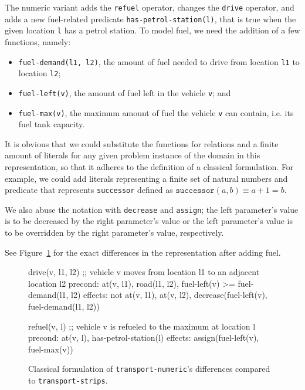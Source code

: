 The numeric variant  adds the \verb+refuel+ operator, changes the \verb+drive+
operator, and adds a new fuel-related predicate \verb+has-petrol-station(l)+, that is true when the given location \verb+l+ has
a petrol station.
To model fuel, we need the addition of a few functions, namely:

\begin{itemize}
\item \verb+fuel-demand(l1, l2)+, the amount of fuel needed to drive
from location \verb+l1+ to location \verb+l2+;
\item \verb+fuel-left(v)+, the amount of fuel left in
the vehicle \verb+v+; and
\item \verb+fuel-max(v)+, the maximum amount of fuel
the vehicle \verb+v+ can contain, i.e. its fuel tank capacity.
\end{itemize}

It is obvious that we could substitute the functions for relations
and a finite amount of literals for any given problem instance of
the domain in this representation,
so that it adheres to the definition of a classical formulation.
For example, we could add literals representing a finite set of
natural numbers and predicate that represents
\verb+successor+ defined as $\texttt{successor}(a, b) \equiv a + 1 = b$.

We also abuse the notation with \verb+decrease+ and \verb+assign+;
the left parameter's value is to be decreased by the right
parameter's value or the left parameter's value is to be overridden
by the right parameter's value, respectively.

See Figure~\ref{code:classical-numeric} for the exact differences
in the representation after adding fuel.

\begin{figure}[tbp]
\begin{code}
drive(v, l1, l2)
  ;; vehicle v moves from location l1 to an adjacent location l2
  precond: at(v, l1), road(l1, l2), fuel-left(v) >= fuel-demand(l1, l2)
  effects: not at(v, l1), at(v, l2),
           decrease(fuel-left(v),  fuel-demand(l1, l2))
  
refuel(v, l)
  ;; vehicle v is refueled to the maximum at location l
  precond: at(v, l), has-petrol-station(l)
  effects: assign(fuel-left(v), fuel-max(v))
\end{code}
\caption[Partial classical formulation of \texttt{transport-numeric}.]{Classical formulation of \texttt{transport-numeric}'s differences compared to \texttt{transport-strips}.}
\label{code:classical-numeric}
\end{figure}

